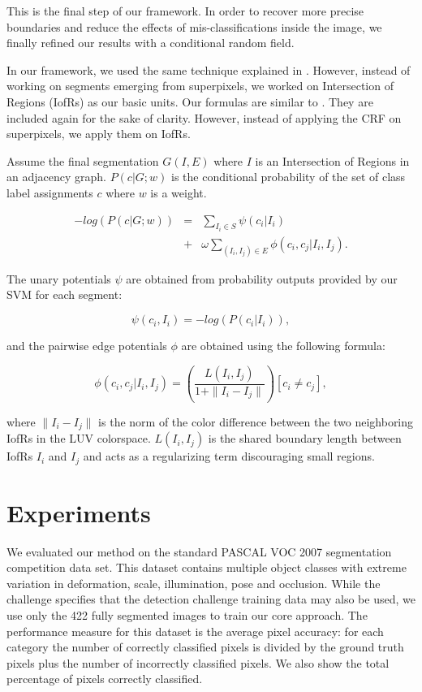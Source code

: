 \documentclass[10pt,twocolumn,letterpaper]{article}
\begin{document}
This is the final step of our framework. In order to recover more precise boundaries
and reduce the effects of mis-classifications inside the image, we finally refined
our results with a conditional random field.

In our framework, we used the same technique explained in \cite{fulkerson09class}.
However, instead of working on segments emerging from superpixels, we worked on Intersection of Regions (IofRs) as our basic units.
Our formulas are similar to \cite{fulkerson09class}. They are included again for the sake of clarity.
However, instead of applying the CRF on superpixels, we apply them on IofRs.

Assume the final segmentation $G(I, E)$ where $I$ is an Intersection of Regions
in an adjacency graph. $P(c|G;w)$ is the conditional probability of the set of
class label assignments $c$ where $w$ is a weight.

\begin{eqnarray}
-log(P(c|G;w)) & = & \sum_{I_i\in{S}}{\psi(c_i|I_i)} \nonumber \\
& + & \omega{\sum_{(I_i, I_j)\in{E}}{\phi(c_i,c_j|I_i,I_j)}}.
\end{eqnarray}

The unary potentials $\psi$ are obtained from probability outputs provided
by our SVM for each segment:

\begin{equation}
\psi(c_i,I_i) = -log(P(c_i|I_i)),
\end{equation}

and the pairwise edge potentials $\phi$ are obtained using the following formula:

\begin{equation}
\phi(c_i,c_j|I_i,I_j) = (\frac{L(I_i,I_j)}{1 + \parallel{I_i} - I_j\parallel})[c_i\neq{c_j}],
\end{equation}

where $\parallel{I_i} - I_j\parallel$ is the norm of the color difference
between the two neighboring IofRs in the LUV colorspace. $L(I_i,I_j)$
is the shared boundary length between IofRs $I_i$ and $I_j$ and acts as
a regularizing term discouraging small regions.

\section{Experiments}\label{sectionExperiments}

We evaluated our method on the standard PASCAL VOC 2007 \cite{pascal-voc-2007} segmentation competition data set.
This dataset contains multiple object classes with extreme variation in deformation, scale,
illumination, pose and occlusion. While the challenge specifies that the
detection challenge training data may also be used, we use only the 422 fully
segmented images to train our core approach. The performance measure for this
dataset is the average pixel accuracy: for each category the number of correctly
classified pixels is divided by the ground truth pixels plus the number of
incorrectly classified pixels. We also show the total percentage of pixels
correctly classified.
\end{document}
